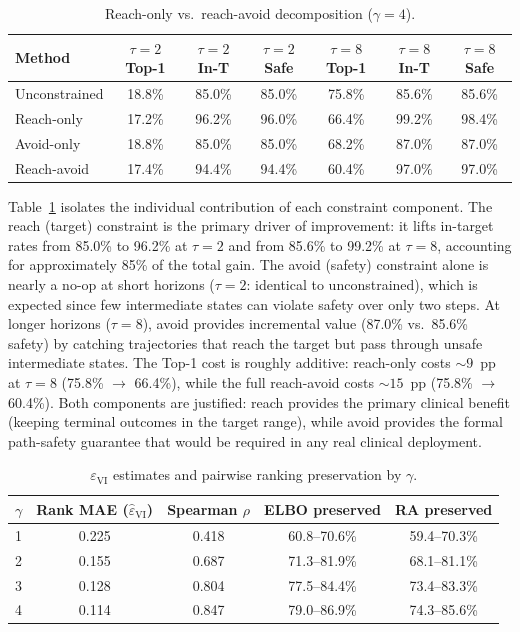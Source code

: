 \documentclass{article}
\begin{document}
\begin{table}[h]
\centering
\caption{Reach-only vs.\ reach-avoid decomposition ($\gamma = 4$).}
\label{tab:decomp}
\small
\begin{tabular}{l c c c c c c}
\toprule
Method & $\tau{=}2$ Top-1 & $\tau{=}2$ In-T & $\tau{=}2$ Safe & $\tau{=}8$ Top-1 & $\tau{=}8$ In-T & $\tau{=}8$ Safe \\
\midrule
Unconstrained & 18.8\% & 85.0\% & 85.0\% & 75.8\% & 85.6\% & 85.6\% \\
Reach-only & 17.2\% & 96.2\% & 96.0\% & 66.4\% & 99.2\% & 98.4\% \\
Avoid-only & 18.8\% & 85.0\% & 85.0\% & 68.2\% & 87.0\% & 87.0\% \\
Reach-avoid & 17.4\% & 94.4\% & 94.4\% & 60.4\% & 97.0\% & 97.0\% \\
\bottomrule
\end{tabular}
\end{table}

Table~\ref{tab:decomp} isolates the individual contribution of each constraint component. The reach (target) constraint is the primary driver of improvement: it lifts in-target rates from 85.0\% to 96.2\% at $\tau = 2$ and from 85.6\% to 99.2\% at $\tau = 8$, accounting for approximately 85\% of the total gain. The avoid (safety) constraint alone is nearly a no-op at short horizons ($\tau = 2$: identical to unconstrained), which is expected since few intermediate states can violate safety over only two steps. At longer horizons ($\tau = 8$), avoid provides incremental value (87.0\% vs.\ 85.6\% safety) by catching trajectories that reach the target but pass through unsafe intermediate states. The Top-1 cost is roughly additive: reach-only costs ${\sim}9$~pp at $\tau = 8$ (75.8\% $\to$ 66.4\%), while the full reach-avoid costs ${\sim}15$~pp (75.8\% $\to$ 60.4\%). Both components are justified: reach provides the primary clinical benefit (keeping terminal outcomes in the target range), while avoid provides the formal path-safety guarantee that would be required in any real clinical deployment.

\begin{table}[h]
\centering
\caption{$\varepsilon_{\mathrm{VI}}$ estimates and pairwise ranking preservation by $\gamma$.}
\label{tab:eps_vi}
\small
\begin{tabular}{l c c c c}
\toprule
$\gamma$ & Rank MAE ($\hat{\varepsilon}_{\mathrm{VI}}$) & Spearman $\rho$ & ELBO preserved & RA preserved \\
\midrule
1 & 0.225 & 0.418 & 60.8--70.6\% & 59.4--70.3\% \\
2 & 0.155 & 0.687 & 71.3--81.9\% & 68.1--81.1\% \\
3 & 0.128 & 0.804 & 77.5--84.4\% & 73.4--83.3\% \\
4 & 0.114 & 0.847 & 79.0--86.9\% & 74.3--85.6\% \\
\bottomrule
\end{tabular}
\end{table}
\end{document}
